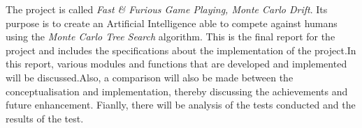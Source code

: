 The project is called \emph{Fast \& Furious Game Playing, Monte Carlo Drift}. Its purpose is to create an Artificial Intelligence able to compete against humans using the \emph{Monte Carlo Tree Search} algorithm.
This is the final report for the  project and includes the specifications about the implementation of the project.In this report, various modules and functions that are developed and implemented will be discussed.Also, a comparison will also be made between the conceptualisation and implementation, thereby discussing the achievements and future enhancement.
Fianlly, there will be analysis  of the tests conducted and the results of the test.













